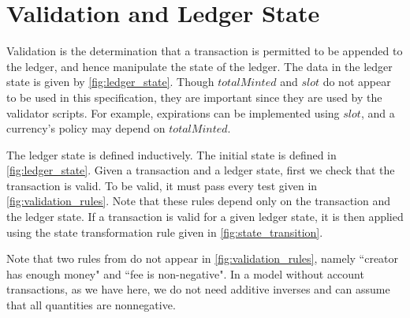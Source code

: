 \documentclass[11pt,a4paper]{article}
\newcommand{\var}[1]{\mathit{#1}}
\begin{document}
\section{Validation and Ledger State}

Validation is the determination that a transaction is permitted to be appended
to the ledger, and hence manipulate the state of the ledger.
The data in the ledger state is given by \cref{fig:ledger_state}.
Though $\var{totalMinted}$ and $\var{slot}$ do not appear to be used in this specification,
they are important since they are used by the validator scripts.
For example, expirations can be implemented using $\var{slot}$, and a currency's
policy may depend on $\var{totalMinted}$.

The ledger state is defined inductively.
The initial state is defined in \cref{fig:ledger_state}.
Given a transaction and a ledger state, first we check that
the transaction is valid.
To be valid, it must pass every test given in \cref{fig:validation_rules}.
Note that these rules depend only on the transaction and the ledger state.
If a transaction is valid for a given ledger state, it is then
applied using the state transformation rule given in \cref{fig:state_transition}.

Note that two rules from \cite{multi_currency} do not appear in \cref{fig:validation_rules},
namely ``creator has enough money" and ``fee is non-negative".
In a model without account transactions, as we have here, we do not need additive
inverses and can assume that all quantities are nonnegative.
\end{document}
